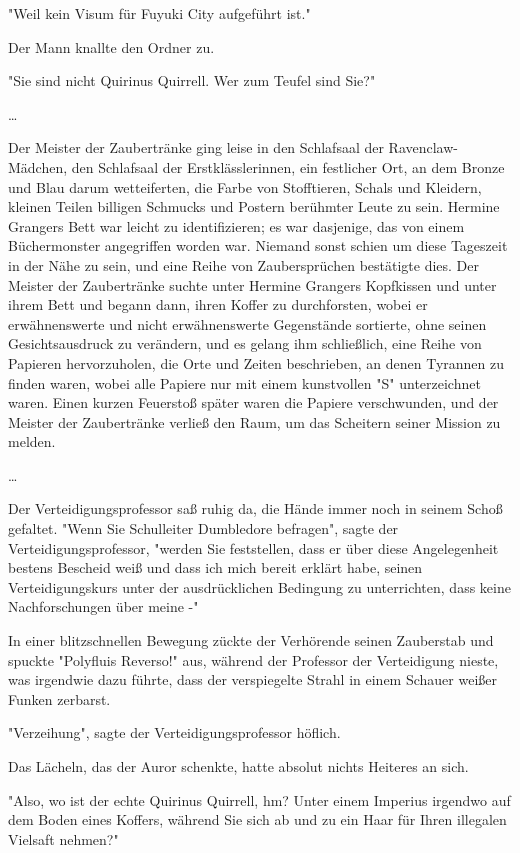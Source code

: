 {"Weil kein Visum für Fuyuki City aufgeführt ist."

Der Mann knallte den Ordner zu.

"Sie sind nicht Quirinus Quirrell. Wer zum Teufel sind Sie?"

…

Der Meister der Zaubertränke ging leise in den Schlafsaal der Ravenclaw-Mädchen, den Schlafsaal der Erstklässlerinnen, ein festlicher Ort, an dem Bronze und Blau darum wetteiferten, die Farbe von Stofftieren, Schals und Kleidern, kleinen Teilen billigen Schmucks und Postern berühmter Leute zu sein. Hermine Grangers Bett war leicht zu identifizieren; es war dasjenige, das von einem Büchermonster angegriffen worden war. Niemand sonst schien um diese Tageszeit in der Nähe zu sein, und eine Reihe von Zaubersprüchen bestätigte dies. Der Meister der Zaubertränke suchte unter Hermine Grangers Kopfkissen und unter ihrem Bett und begann dann, ihren Koffer zu durchforsten, wobei er erwähnenswerte und nicht erwähnenswerte Gegenstände sortierte, ohne seinen Gesichtsausdruck zu verändern, und es gelang ihm schließlich, eine Reihe von Papieren hervorzuholen, die Orte und Zeiten beschrieben, an denen Tyrannen zu finden waren, wobei alle Papiere nur mit einem kunstvollen "S" unterzeichnet waren. Einen kurzen Feuerstoß später waren die Papiere verschwunden, und der Meister der Zaubertränke verließ den Raum, um das Scheitern seiner Mission zu melden.

…

Der Verteidigungsprofessor saß ruhig da, die Hände immer noch in seinem Schoß gefaltet. "Wenn Sie Schulleiter Dumbledore befragen", sagte der Verteidigungsprofessor, "werden Sie feststellen, dass er über diese Angelegenheit bestens Bescheid weiß und dass ich mich bereit erklärt habe, seinen Verteidigungskurs unter der ausdrücklichen Bedingung zu unterrichten, dass keine Nachforschungen über meine -"

In einer blitzschnellen Bewegung zückte der Verhörende seinen Zauberstab und spuckte "Polyfluis Reverso!" aus, während der Professor der Verteidigung nieste, was irgendwie dazu führte, dass der verspiegelte Strahl in einem Schauer weißer Funken zerbarst.

"Verzeihung", sagte der Verteidigungsprofessor höflich.

Das Lächeln, das der Auror schenkte, hatte absolut nichts Heiteres an sich.

"Also, wo ist der echte Quirinus Quirrell, hm? Unter einem Imperius irgendwo auf dem Boden eines Koffers, während Sie sich ab und zu ein Haar für Ihren illegalen Vielsaft nehmen?"

}
